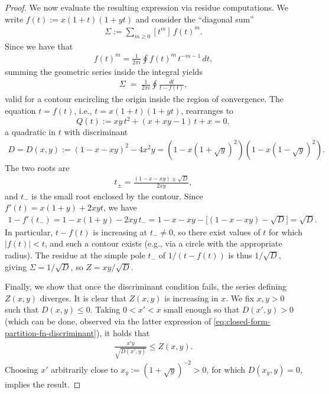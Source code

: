 \documentclass[11pt]{amsart}
\numberwithin{equation}{section}
\numberwithin{equation}{section}
\newcommand{\1}{\mathbbm{1}}
\theoremstyle{definition}
\begin{document}
\begin{proof}
\medskip We now evaluate the resulting expression via residue computations. We write $f(t):=x(1+t)(1+yt)$ and consider the ``diagonal sum''
\begin{align*}
    \Sigma:=\sum_{m\ge 0}[t^m]\,f(t)^m.
\end{align*}
Since we have that
\begin{align*}
    [t^m]f(t)^m=\frac{1}{2\pi i}\oint f(t)^m\,t^{-m-1}\,dt,
\end{align*}
summing the geometric series inside the integral yields
\begin{align*}
    \Sigma\;=\;\frac{1}{2\pi i}\oint\frac{dt}{t-f(t)},
\end{align*}
valid for a contour encircling the origin inside the region of convergence. The equation $t=f(t)$, i.e., $t=x(1+t)(1+yt)$, rearranges to
\begin{equation}\label{eq:diagonal-quadratic}
    Q(t):=xy\,t^{2}+(x+xy-1)\,t+x=0,
\end{equation}
a quadratic in $t$ with discriminant
\begin{align} \label{eq:closed-form-partition-fn-discriminant}
    D = D(x,y) := (1-x-xy)^{2}-4x^{2}y = \left( 1 - x(1+\sqrt{y})^2 \right)\left( 1 - x(1-\sqrt{y})^2 \right).
\end{align}
The two roots are
\begin{align*}
    t_{\pm}=\frac{(1-x-xy)\pm\sqrt{D}}{2xy},
\end{align*}
and $t_{-}$ is the small root enclosed by the contour. Since $f'(t)=x(1+y)+2xyt$, we have
\begin{align*}
    1-f'(t_{-})=1-x(1+y)-2xy\,t_{-} =1-x-xy-\bigl[(1-x-xy)-\sqrt{D}\bigr]=\sqrt{D}.
\end{align*}
In particular, $t - f(t)$ is increasing at $t_- \neq 0$, so there exist values of $t$ for which $|f(t)| < t$, and such a contour exists (e.g., via a circle with the appropriate radius). The residue at the simple pole $t_{-}$ of $1/(t-f(t))$ is thus $1/\sqrt{D}$, giving $\Sigma=1/\sqrt{D}$, so $Z=xy/\sqrt{D}$.

\medskip Finally, we show that once the discriminant condition fails, the series defining $Z(x,y)$ diverges. It is clear that $Z(x,y)$ is increasing in $x$. We fix $x,y > 0$ such that $D(x,y) \leq 0$. Taking $0 < x' < x$ small enough so that $D(x',y) > 0$ (which can be done, observed via the latter expression of \eqref{eq:closed-form-partition-fn-discriminant}), it holds that 
\begin{align*}
    \frac{x'y}{\sqrt{D(x',y)}} \leq Z(x,y).
\end{align*}
Choosing $x'$ arbitrarily close to $x_y := (1+\sqrt{y})^{-2} > 0$, for which $D(x_y, y) = 0$, implies the result.
\end{proof}
\end{document}
